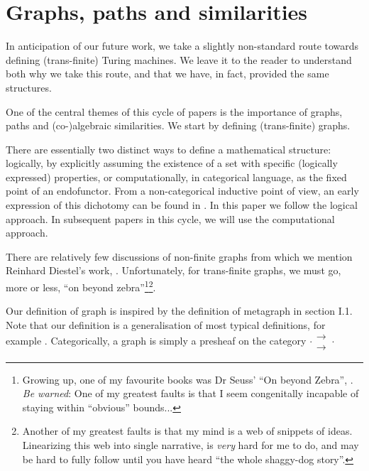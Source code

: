 \documentclass[a4paper,openany]{amsart}
\begin{document}
\section{Graphs, paths and similarities}

In anticipation of our future work, we take a slightly non-standard route towards defining
(trans-finite) Turing machines. We leave it to the reader to understand both why we take
this route, and that we have, in fact, provided the same structures.

One of the central themes of this cycle of papers is the importance of graphs, paths and
(co-)algebraic similarities. We start by defining (trans-finite) graphs.

There are essentially two distinct ways to define a mathematical structure: logically, by
explicitly assuming the existence of a set with specific (logically expressed) properties,
or computationally, in categorical language, as the fixed point of an endofunctor. From a
non-categorical inductive point of view, an early expression of this dichotomy can be
found in \cite[page 1]{moschovakis1974induction}. In this paper we follow the logical
approach. In subsequent papers in this cycle, we will use the computational approach.

There are relatively few discussions of non-finite graphs from which we mention Reinhard
Diestel's work, \cite{diestel2006graphTheory, diestel1990infiniteGraphTheory}.
Unfortunately, for trans-finite graphs, we must go, more or less, ``on beyond
zebra''\footnote{Growing up, one of my favourite books was Dr Seuss' ``On beyond Zebra'',
\cite{seuss1955onBeyondZebra}. \emph{Be warned}: One of my greatest faults is that I seem
congenitally incapable of staying within ``obvious'' bounds...}\footnote{Another of my
greatest faults is that my mind is a web of snippets of ideas. Linearizing this web into
single narrative, is \emph{very} hard for me to do, and may be hard to fully follow until 
you have heard ``the whole shaggy-dog story''.}.

Our definition of graph is inspired by the definition of metagraph in
\cite{macLane1971categoriesWorkingMathematician} section I.1. Note that our definition is
a generalisation of most typical definitions, for example \cite[section
1.1]{diestel2006graphTheory}. Categorically, a graph is simply a presheaf on the category
$ \cdot \substack{\mathbf{\longrightarrow} \\[-0.7ex] \mathbf{\longrightarrow}} \cdot $
\end{document}
